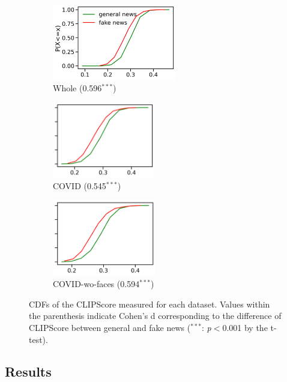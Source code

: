 \documentclass[11pt]{article}
\begin{document}
\begin{figure}[t]
     \centering
     \begin{subfigure}{.34\linewidth}
         \includegraphics[width=\linewidth, height=3.3cm]{fig/cdf_whole_final.png}
          \caption{Whole (0.596$^{***}$)}
         \label{fig:whole}
     \end{subfigure}
     \hfill
     \begin{subfigure}{.3\linewidth}
         \includegraphics[width=\linewidth, height=3.3cm]{fig/cdf_covid_final.png}
         \caption{COVID (0.545$^{***}$)}
         \label{fig:covid}
     \end{subfigure}
     \hfill
     \begin{subfigure}{.3\linewidth}
         \includegraphics[width=\linewidth, height=3.3cm]{fig/cdf_covidwoface_final.png}
         \caption{COVID-wo-faces (0.594$^{***}$)}
         \label{fig:covidface}
     \end{subfigure}
        \caption{CDFs of the CLIPScore measured for each dataset. Values within the parenthesis indicate Cohen's d corresponding to the difference of CLIPScore between general and fake news ($^{***}$: \emph{p}$<$0.001 by the t-test).}
        \label{fig:cdfs}
\end{figure}

\subsection{Results}
\end{document}
